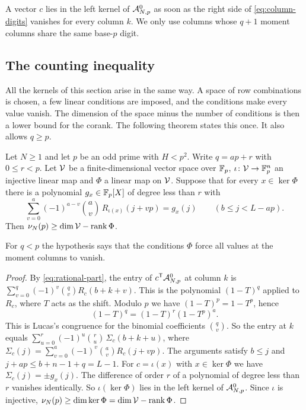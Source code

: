A vector $c$ lies in the left kernel of $\mathcal A^0_{N,p}$ as soon as the right side of
\eqref{eq:column-digits} vanishes for every column $k$. We only use columns whose $q+1$ moment columns
share the same base-$p$ digit.

\subsection{The counting inequality}
All the kernels of this section arise in the same way. A space of row combinations is chosen, a few linear
conditions are imposed, and the conditions make every value vanish. The dimension of the space minus the
number of conditions is then a lower bound for the corank. The following theorem states this once. It also
allows $q\ge p$.

\begin{theorem}\label{thm:count}
Let $N\ge1$ and let $p$ be an odd prime with $H<p^2$. Write $q=ap+r$ with $0\le r<p$. Let $\mathcal V$ be a
finite-dimensional vector space over $\mathbb F_p$, $\iota\colon\mathcal V\to\mathbb F_p^n$ an injective linear map and $\Phi$ a
linear map on $\mathcal V$. Suppose that for every $x\in\ker\Phi$ there is a polynomial $g_x\in\mathbb F_p[X]$ of degree
less than $r$ with
\[
 \sum_{v=0}^a(-1)^{a-v}\binom av\,R_{\iota(x)}(j+vp)=g_x(j)\qquad(b\le j<L-ap).
\]
Then $\nu_N(p)\ge\dim\mathcal V-\operatorname{rank}\Phi$.
\end{theorem}

For $q<p$ the hypothesis says that the conditions $\Phi$ force all values at the moment columns to vanish.

\begin{proof}
By \eqref{eq:rational-part}, the entry of $c^{\mathsf T}\mathcal A^0_{N,p}$ at column $k$ is
$\sum_{v=0}^q(-1)^v\binom qvR_c(b+k+v)$. This is the polynomial $(1-T)^q$ applied to $R_c$, where $T$ acts as
the shift. Modulo $p$ we have $(1-T)^p=1-T^p$, hence
\[
 (1-T)^q=(1-T)^r(1-T^p)^a .
\]
This is Lucas's congruence for the binomial coefficients $\binom qv$. So the entry at $k$ equals
$\sum_{u=0}^r(-1)^u\binom ru\,\Sigma_c(b+k+u)$, where
$\Sigma_c(j)=\sum_{v=0}^a(-1)^v\binom av R_c(j+vp)$. The arguments satisfy $b\le j$ and
$j+ap\le b+n-1+q=L-1$. For $c=\iota(x)$ with $x\in\ker\Phi$ we have $\Sigma_c(j)=\pm g_x(j)$. The difference
of order $r$ of a polynomial of degree less than $r$ vanishes identically. So $\iota(\ker\Phi)$ lies in the
left kernel of $\mathcal A^0_{N,p}$. Since $\iota$ is injective, $\nu_N(p)\ge\dim\ker\Phi=\dim\mathcal V-\operatorname{rank}\Phi$.
\end{proof}

